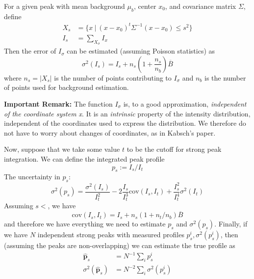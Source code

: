 \documentclass[11pt,a4paper]{article}
\let\oldhat\hat
\renewcommand{\hat}[1]{\oldhat{\mathbf{#1}}}
\def\cov{\mathrm{cov}}
\begin{document}
For a given peak with mean background $\mu_b$, center $x_0$, and covariance matrix $\Sigma$, define
\begin{align}
  X_s &= \{ x \ | \ (x-x_0)^t\Sigma^{-1}(x-x_0) \leq s^2\} \\
  I_s &= \sum_{X_\sigma} I_x
\end{align}
Then the error of $I_\sigma$ can be estimated (assuming Poisson statistics) as
\begin{equation}
  \sigma^2(I_s) = I_s + n_s(1+\frac{n_s}{n_b}) \overline{B}
\end{equation}
where $n_s = |X_s|$ is the number of points contributing to $I_\sigma$ and $n_b$ is the number of points used for background estimation.

\textbf{Important Remark:} The function $I_\sigma$ is, to a good approximation, \emph{independent of the coordinate system x}.
It is an \emph{intrinsic} property of the intensity distribution, independent of the coordinates used to express the distribution.
We therefore do not have to worry about changes of coordinates, as in Kabsch's paper.


Now, suppose that we take some value $t$ to be the cutoff for strong peak integration. We can define the integrated peak profile
\begin{equation}
  p_s := I_s / I_t
\end{equation}
The uncertainty in $p_s$:
\begin{equation}
  \sigma^2(p_s)
  = \frac{\sigma^2(I_s)}{I_t^2} - 2 \frac{I_s}{I_t^3} \cov(I_s, I_t)
    + \frac{I_s^2}{I_t^4} \sigma^2(I_t)
\end{equation}
Assuming $s < $, we have
\begin{equation}
  \cov(I_s, I_t) = I_s + n_s(1+n_t/n_b)\overline{B}
\end{equation}
and therefore we have everything we need to estimate $p_s$ and $\sigma^2(p_s)$. Finally, if we have $N$ independent strong
peaks with measured profiles $p^i_s, \sigma^2(p^i_s)$, then (assuming the peaks are non-overlapping) we can estimate the
true profile as
\begin{align}
  \hat{p}_s &= N^{-1} \sum_i p^i_s \\
 \sigma^2(\hat{p}_s) &= N^{-2} \sum_i \sigma^2(p^i_s)
\end{align}
\end{document}
